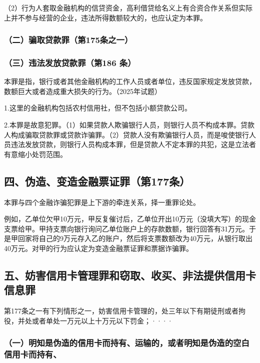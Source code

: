 （2）行为人套取金融机构的信贷资金，高利借贷给名义上有合资合作关系但实际上并不参与经营的企业，违法所得数额较大的，也应认定为本罪。

\subsubsection*{（二）骗取贷款罪（第175条之一）}


\subsubsection*{（三）违法发放贷款罪（第186 条）}

本罪是指，银行或者其他金融机构的工作人员或者单位，违反国家规定发放贷款，数额巨大或者造成重大损失的行为。（2025年试题）

1.这里的金融机构包括农村信用社，但不包括小额贷款公司。

2.本罪是故意犯罪。（1）如果贷款人欺骗银行人员，则银行人员不构成本罪。贷款人构成骗取贷款罪或贷款诈骗罪。（2）贷款人没有欺骗银行人员，而是唆使银行人员违法发放贷款，则银行人员构成本罪，但是贷款人不定本罪的共犯，这是立法者有意缩小处罚范围。

\subsection*{四、伪造、变造金融票证罪（第177条）}

本罪与四个金融诈骗犯罪是上下游的牵连关系，择一重罪论处。


例如，乙单位欠甲10万元，甲反复催讨后，乙单位开出10万元（没填大写）的现金支票给甲。甲持支票向银行询问乙单位账户上的存款数额，银行回答有31万元。于是甲回家将自己的9万元存入乙的账户，然后将支票数额改为40万元，从银行取出40万元。对甲的行为应认定为变造金融票证罪和票据诈骗罪。

\subsection*{五、妨害信用卡管理罪和窃取、收买、非法提供信用卡信息罪}

第177条之一有下列情形之一，妨害信用卡管理的，处三年以下有期徒刑或者拘役，并处或者单处一万元以上十万元以下罚金；····

\subsubsection*{（一）明知是伪造的信用卡而持有、运输的，或者明知是伪造的空白信用卡而持有、}

